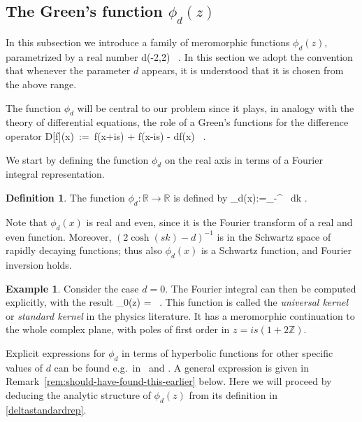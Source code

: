 \documentclass[12pt]{article}
\theoremstyle{plain}
\theoremstyle{definition}
\newtheorem{example}[theorem]{Example}
\newtheorem{definition}[theorem]{Definition}
\numberwithin{equation}{section}
\numberwithin{theorem}{section}
\def\be#1\ee{\begin{equation}#1\end{equation}}
\begin{document}
\subsection{The Green's function $\phi_d(z)$}
\label{GreensChapter}

In this subsection we introduce a family of meromorphic functions $\phi_d(z)$, parametrized by a real number
\be\label{d_in_(-2,2)}
	d\in(-2,2) \ .
\ee	 
In this section we adopt the convention that whenever the parameter $d$ appears, it is understood that it is chosen from the above range.

The function $\phi_d$ will be central to our problem since it plays, in analogy with the theory of differential equations, the role of a Green's functions for the difference operator
\be\label{diffop}
D[f](x) \,:=\, f(x+is) + f(x-is) - d\cdot f(x) \ .
\ee

We start by defining the function $\phi_d$ on the real axis in terms of a Fourier integral representation.

\begin{definition}
The function $\phi_d:\mathbb{R}\rightarrow\mathbb{R}$ is defined by
\be\label{deltastandardrep}
\phi_d(x):=\int_{-\infty}^{\infty}  \, dk .
\ee
\end{definition}
Note that $\phi_d(x)$ is real and even, since it is the Fourier transform of a real and even function. Moreover, $(2\cosh(sk)-d)^{-1}$ is in the Schwartz space of rapidly decaying functions; thus also $\phi_d(x)$ is a Schwartz function, and Fourier inversion holds.

\begin{example} \label{phi_0} Consider the case $d=0$. The Fourier integral can then be computed explicitly, with the result
\be
\phi_0(z) = \ .
\ee
This function is called the \textsl{universal kernel} or \textsl{standard kernel} in the physics literature.
It has a meromorphic continuation to the whole complex plane, with poles of first order in $z=is(1+2\mathbb{Z})$.
\end{example}

Explicit expressions for $\phi_d$ in terms of hyperbolic functions for other specific values of $d$ can be found e.g.\ in~\cite[App.\,D]{Dorey:2007zx} and \cite[Eqn.\,4.22]{BLZ4}. A general expression is given in Remark~\ref{rem:should-have-found-this-earlier} below.
Here we will proceed by deducing the analytic structure of $\phi_d(z)$ from its definition in \eqref{deltastandardrep}.
\end{document}

